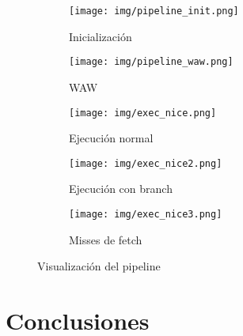 \documentclass {article}
\begin{document}
\begin{figure}[h]
  \centering
  \label{fig:result_viz}
  \begin{subfigure}[b]{0.9\textwidth}
    \texttt{[image: img/pipeline\_init.png]}
    \caption{\label{fig:pipeline_init} Inicialización}
  \end{subfigure}
  
  \begin{subfigure}[b]{0.9\textwidth}
    \texttt{[image: img/pipeline\_waw.png]}
    \caption{\label{fig:pipeline_waw} WAW}
  \end{subfigure}
  \hfill
  
  \begin{subfigure}[b]{0.9\textwidth}
    \texttt{[image: img/exec\_nice.png]}
    \caption{\label{fig:viz} Ejecución normal}
  \end{subfigure}
  
  \begin{subfigure}[b]{0.9\textwidth}
    \texttt{[image: img/exec\_nice2.png]}
    \caption{\label{fig:viz2} Ejecución con branch}
  \end{subfigure}
  
  \begin{subfigure}[b]{0.9\textwidth}
    \texttt{[image: img/exec\_nice3.png]}
    \caption{\label{fig:viz3} Misses de fetch}
  \end{subfigure}
  \caption{Visualización del pipeline}
\end{figure}

\section{Conclusiones}





\end{document}
